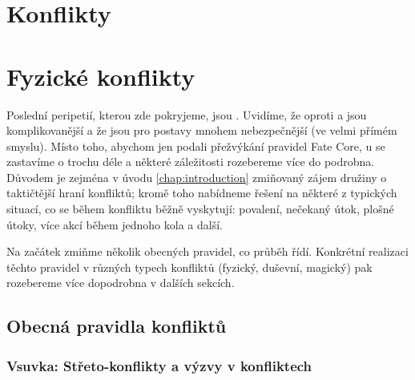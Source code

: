 \section{Konflikty}

\section{Fyzické konflikty}
\label{sec:boj}

Poslední peripetií, kterou zde pokryjeme, jsou . Uvidíme, že oproti  a  jsou komplikovanější a že jsou pro postavy mnohem nebezpečnější (ve velmi přímém smyslu). Místo toho, abychom jen podali přežvýkání pravidel Fate Core, u  se zastavíme o trochu déle a některé záležitosti rozebereme více do podrobna. Důvodem je zejména v úvodu \ref{chap:introduction} zmiňovaný zájem družiny o taktičtější hraní konfliktů; kromě toho nabídneme řešení na některé z typických situací, co se během konfliktu běžně vyskytují: povalení, nečekaný útok, plošné útoky, více akcí během jednoho kola a další.

Na začátek zmiňme několik obecných pravidel, co průběh  řídí. Konkrétní realizaci těchto pravidel v různých typech konfliktů (fyzický, duševní, magický) pak rozebereme více dopodrobna v dalších sekcích.

\subsection{Obecná pravidla konfliktů}
\label{sec:obecna-pravidla}

\subsubsection{Vsuvka: Střeto-konflikty a výzvy v konfliktech}
\label{sec:hybrid}

